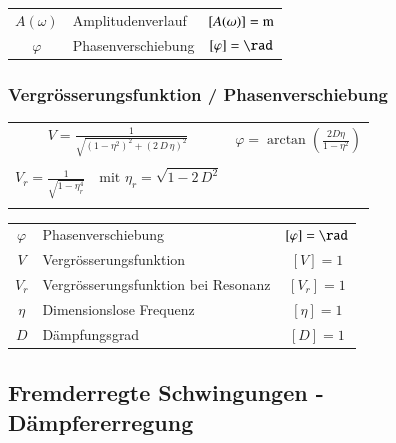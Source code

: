 \begin{tabular}{c l c}
$A(\omega)$ & Amplitudenverlauf & $[A(\omega)] = \mathrm{m}$ \\
$\varphi$ & Phasenverschiebung & $[\varphi] = \rad$
\end{tabular}




\subsubsection{Vergrösserungsfunktion / Phasenverschiebung}

\begin{tabular}{c c}
$ \boxed{ V = \frac{1}{\sqrt{(1- \eta^2)^2 + (2 \, D \, \eta)^2} } } $ & $ \boxed{ \varphi = \arctan \left( \frac{2 D \eta}{1 - \eta^2}  \right) } $ \\
\\
$ \boxed{ V_r = \frac{1}{\sqrt{ 1 - \eta_r^4} } \quad \text{mit } \eta_r = \sqrt{1 - 2 \, D^2}  } $ \\
\\
\end{tabular}


\begin{tabular}{c l c}
$\varphi$ & Phasenverschiebung & $[ \varphi] = \rad$ \\
$V$ & Vergrösserungsfunktion & $[V] = 1$ \\
$V_r$ & Vergrösserungsfunktion bei Resonanz & $[V_r] = 1$ \\
$\eta$ & Dimensionslose Frequenz & $[\eta] = 1$  \\
$D$ & Dämpfungsgrad & $[D] = 1$ 
\end{tabular}




\subsection{Fremderregte Schwingungen - Dämpfererregung}\label{Dämpfererregung}

